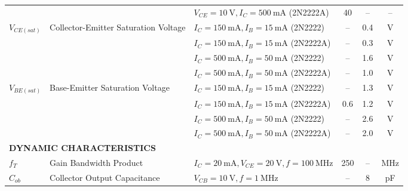 \documentclass[12pt, a4paper]{article}
\numberwithin{table}{section}
\numberwithin{figure}{section}
\begin{document}
\begin{table}[h!]
{\begin{tabularx}{\textwidth}{l X l c c c}
                      &                 & $V_{CE} = 10~\text{V}, I_C = 500~\text{mA}$ (2N2222A) & 40 & -- & -- \\
        $V_{CE(sat)}$ & Collector-Emitter Saturation Voltage & $I_C = 150~\text{mA}, I_B = 15~\text{mA}$ (2N2222) & -- & 0.4 & V \\
                      &                                      & $I_C = 150~\text{mA}, I_B = 15~\text{mA}$ (2N2222A) & -- & 0.3 & V \\
                      &                                      & $I_C = 500~\text{mA}, I_B = 50~\text{mA}$ (2N2222) & -- & 1.6 & V \\
                      &                                      & $I_C = 500~\text{mA}, I_B = 50~\text{mA}$ (2N2222A) & -- & 1.0 & V \\
        $V_{BE(sat)}$ & Base-Emitter Saturation Voltage      & $I_C = 150~\text{mA}, I_B = 15~\text{mA}$ (2N2222) & -- & 1.3 & V \\
                      &                                      & $I_C = 150~\text{mA}, I_B = 15~\text{mA}$ (2N2222A) & 0.6 & 1.2 & V \\
                      &                                      & $I_C = 500~\text{mA}, I_B = 50~\text{mA}$ (2N2222) & -- & 2.6 & V \\
                      &                                      & $I_C = 500~\text{mA}, I_B = 50~\text{mA}$ (2N2222A) & -- & 2.0 & V \\
        \midrule
        \multicolumn{6}{l}{\textbf{DYNAMIC CHARACTERISTICS}} \\
        $f_T$         & Gain Bandwidth Product & $I_C = 20~\text{mA}, V_{CE} = 20~\text{V}, f = 100~\text{MHz}$ & 250 & -- & MHz \\
        $C_{ob}$      & Collector Output Capacitance & $V_{CB} = 10~\text{V}, f = 1~\text{MHz}$ & -- & 8 & pF \\
        \bottomrule
    \end{tabularx}}
\end{table}

\vspace{\fill}

\newpage
\end{document}
